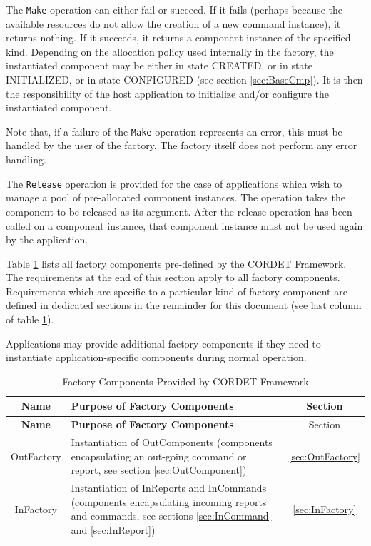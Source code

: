 \documentclass[a4paper,10pt]{article}
\begin{document}
The \texttt{Make} operation can either fail or succeed. If it fails (perhaps because the available resources do not allow the creation of a new command instance), it returns nothing. If it succeeds, it returns a component instance of the specified kind. Depending on the allocation policy used internally in the factory, the instantiated component may be either in state CREATED, or in state INITIALIZED, or in state CONFIGURED (see section \ref{sec:BaseCmp}). It is then the responsibility of the host application to initialize and/or configure the instantiated component.

Note that, if a failure of the \texttt{Make} operation represents an error, this must be handled by the user of the factory. The factory itself does not perform any error handling.

The \texttt{Release} operation is provided for the case of applications which wish to manage a pool of pre-allocated component instances. The operation takes the component to be released as its argument. After the release operation has been called on a component instance, that component instance must not be used again by the application. 

Table \ref{tab:FactoryCmp} lists all factory components pre-defined by the CORDET Framework. The requirements at the end of this section apply to all factory components. 
Requirements which are specific to a particular kind of factory component are defined in dedicated sections in the remainder for this document (see last column of table \ref{tab:FactoryCmp}). 

Applications may provide additional factory components if they need to instantiate application-specific components during normal operation.

\begin{longtable}{|c|p{8cm}|c|}
\caption{Factory Components Provided by CORDET Framework}\label{tab:FactoryCmp} \\
\hline
\rowcolor{light-gray}
\textbf{Name} & \textbf{Purpose of Factory Components} & {Section}\\
\hline\hline
\endfirsthead
\rowcolor{light-gray}
\textbf{Name} & \textbf{Purpose of Factory Components} & {Section}\\
\hline\hline
\endhead
OutFactory & Instantiation of OutComponents (components encapsulating an out-going command or report, see section \ref{sec:OutComponent}) & {\ref{sec:OutFactory}}\\
\hline
InFactory & Instantiation of InReports and InCommands (components encapsulating incoming reports and commands, see sections \ref{sec:InCommand} and \ref{sec:InReport}) & {\ref{sec:InFactory}}\\
\hline
\end{longtable}
 
\end{document}
